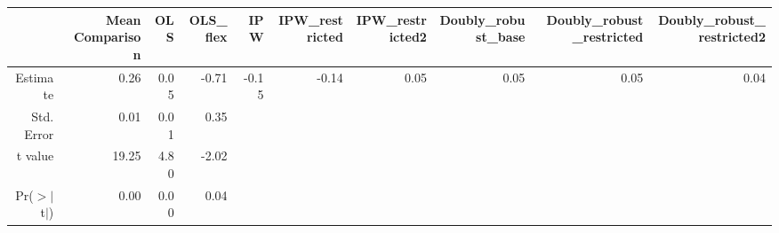\begin{table}[ht]
\centering
\begin{tabular}{rrrrrrrrrr}
  \hline
 & Mean Comparison & OLS & OLS\_flex & IPW & IPW\_restricted & IPW\_restricted2 & Doubly\_robust\_base & Doubly\_robust\_restricted & Doubly\_robust\_restricted2 \\ 
  \hline
Estimate & 0.26 & 0.05 & -0.71 & -0.15 & -0.14 & 0.05 & 0.05 & 0.05 & 0.04 \\ 
  Std. Error & 0.01 & 0.01 & 0.35 &  &  &  &  &  &  \\ 
  t value & 19.25 & 4.80 & -2.02 &  &  &  &  &  &  \\ 
  Pr($>$$|$t$|$) & 0.00 & 0.00 & 0.04 &  &  &  &  &  &  \\ 
   \hline
\end{tabular}
\end{table}
